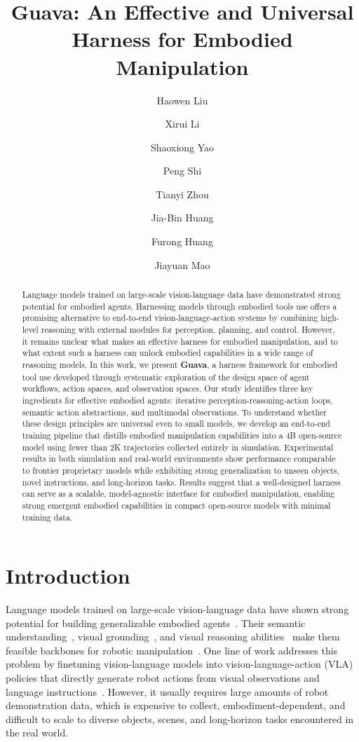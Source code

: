 \documentclass{llmxive}
\title{Guava: An Effective and Universal Harness for Embodied Manipulation}
\author{Haowen Liu \and Xirui Li \and Shaoxiong Yao \and Peng Shi \and Tianyi Zhou \and Jia-Bin Huang \and Furong Huang \and Jiayuan Mao}
\begin{document}
\maketitle
\begin{abstract}
Language models trained on large-scale vision-language data have demonstrated strong potential for embodied agents. Harnessing models through embodied tools use offers a promising alternative to end-to-end vision-language-action systems by combining high-level reasoning with external modules for perception, planning, and control. However, it remains unclear what makes an effective harness for embodied manipulation, and to what extent such a harness can unlock embodied capabilities in a wide range of reasoning models.
In this work, we present \textbf{Guava}, a harness framework for embodied tool use developed through systematic exploration of the design space of agent workflows, action spaces, and observation spaces. Our study identifies three key ingredients for effective embodied agents: iterative perception-reasoning-action loops, semantic action abstractions, and multimodal observations. To understand whether these design principles are universal even to small models, we develop an end-to-end training pipeline that distills embodied manipulation capabilities into a 4B open-source model using fewer than 2K trajectories collected entirely in simulation.
Experimental results in both simulation and real-world environments show performance comparable to frontier proprietary models while exhibiting strong generalization to unseen objects, novel instructions, and long-horizon tasks. 
Results suggest that a well-designed harness can serve as a scalable, model-agnostic interface for embodied manipulation, enabling strong emergent embodied capabilities in compact open-source models with minimal training data.
\end{abstract}
\section{Introduction}
\label{sec:introduction}

Language models trained on large-scale vision-language data have shown strong potential for building generalizable embodied agents~\citep{driess2023palme,brohan2023rt}. 
Their semantic understanding~\citep{kojima2023largelanguagemodelszeroshot}, visual grounding~\citep{liu2023visualinstructiontuning}, and visual reasoning abilities~\citep{thawakar-etal-2025-llamav, xu2025llavacotletvisionlanguage, lu2024mathvistaevaluatingmathematicalreasoning} make them feasible backbones for robotic manipulation~\citep{fu2026capxframeworkbenchmarkingimproving}. 
One line of work addresses this problem by finetuning vision-language models into vision-language-action (VLA) policies that directly generate robot actions from visual observations and language instructions~\citep{li2024vision,black2025pi,pi0.5,lee2025molmoact,hancock2026actions}. 
However, it usually requires large amounts of robot demonstration data, which is expensive to collect, embodiment-dependent, and difficult to scale to diverse objects, scenes, and long-horizon tasks encountered in the real world.
\end{document}
